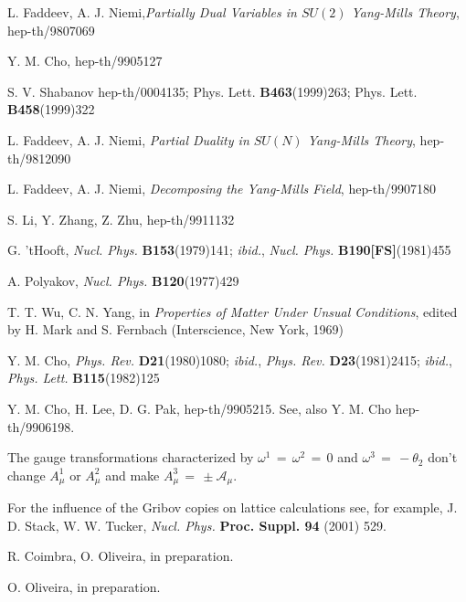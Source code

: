 \documentclass[a4paper,a4paper]{article}
\begin{document}
\begin{thebibliography}{99}

 L. Faddeev, A. J. Niemi,\textit{Partially Dual Variables
 in $SU(2)$ Yang-Mills Theory}, hep-th/9807069

 Y. M. Cho, hep-th/9905127

 S. V. Shabanov hep-th/0004135; 
              Phys. Lett. \textbf{B463}(1999)263;
              Phys. Lett. \textbf{B458}(1999)322

 L. Faddeev, A. J. Niemi, \textit{Partial Duality in $SU(N)$
                  Yang-Mills Theory}, hep-th/9812090

 L. Faddeev, A. J. Niemi, \textit{Decomposing the Yang-Mills
                 Field}, hep-th/9907180

 S. Li, Y. Zhang, Z. Zhu, hep-th/9911132

 G. 'tHooft, \textit{Nucl. Phys.} \textbf{B153}(1979)141; 
               \textit{ibid.}, \textit{Nucl. Phys.} \textbf{B190[FS]}(1981)455

 A. Polyakov, \textit{Nucl. Phys.} \textbf{B120}(1977)429

 T. T. Wu, C. N. Yang, in \textit{Properties of Matter Under
               Unsual Conditions}, edited by H. Mark and S. Fernbach
               (Interscience, New York, 1969)

 Y. M. Cho, \textit{Phys. Rev.} \textbf{D21}(1980)1080;
                \textit{ibid.}, \textit{Phys. Rev.} \textbf{D23}(1981)2415;
                \textit{ibid.}, \textit{Phys. Lett.} \textbf{B115}(1982)125

 Y. M. Cho, H. Lee, D. G. Pak, hep-th/9905215. See, also
                    Y. M. Cho hep-th/9906198.

 The gauge transformations characterized by $\omega^1 \, = \, 
\omega^2 \, = \, 0$ and $\omega^3 \, = \, - \theta_2$ don't change $A^1_\mu$
or $A^2_\mu$ and make $A^3_\mu \, = \, \pm \mathcal{A}_\mu$.

 For the influence of the Gribov copies on lattice calculations
                see, for example, J. D. Stack, W. W. Tucker, 
                \textit{Nucl. Phys.} \textbf{Proc. Suppl. 94} (2001) 529.

 R. Coimbra, O. Oliveira, in preparation.

 O. Oliveira, in preparation.


\end{thebibliography}
\end{document}
